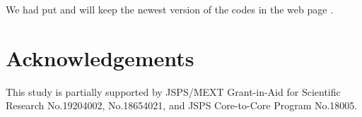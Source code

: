 \documentclass{svmult}
\def\bbf2{\ifmmode \mathbb{F}_2 \else $\mathbb{F}_2$ \fi}
\begin{document}


We had put and will keep the newest version of the codes 
in the web page \cite{web:SFMT}.

\section*{Acknowledgements}
This study is partially
supported by JSPS/MEXT Grant-in-Aid for Scientific Research
No.19204002, No.18654021, and JSPS Core-to-Core Program
No.18005.



\end{document}
